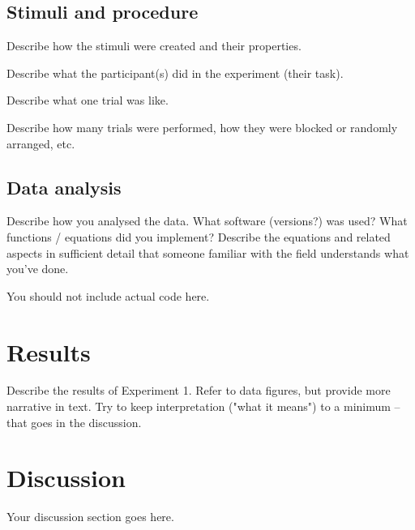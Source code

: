 \documentclass[
    a4paper,
    doc, %
    natbib
]{apa6}
\begin{document}
\subsection{Stimuli and procedure}

Describe how the stimuli were created and their properties.

Describe what the participant(s) did in the experiment (their task).

Describe what one trial was like.

Describe how many trials were performed, how they were blocked or randomly arranged, etc.

\subsection{Data analysis}

Describe how you analysed the data. What software (versions?) was used? 
What functions / equations did you implement?
Describe the equations and related aspects in sufficient detail that someone familiar with the field understands what you've done.

You should not include actual code here. 


\section{Results}

Describe the results of Experiment 1. Refer to data figures, but provide more narrative in text. Try to keep interpretation ("what it means") to a minimum -- that goes in the discussion.

\section{Discussion}

Your discussion section goes here.


\end{document}
